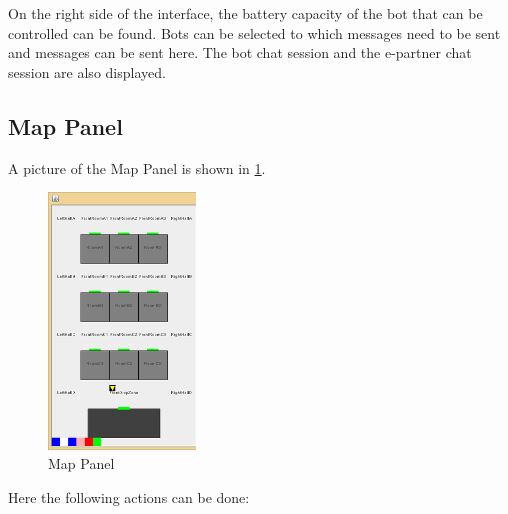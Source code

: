 On the right side of the interface, the battery capacity of the bot that can be controlled can be found. Bots can be selected to which messages need to be sent and messages can be sent here. The bot chat session and the e-partner chat session are also displayed.


\subsection{Map Panel}
A picture of the Map Panel is shown in \ref{fig:mapPanel}.

\begin{figure}[h]
\begin{center}
\includegraphics[width= 0.35\textwidth]{HumanPlayerGUI/hpg-left.png}
\end{center}
\caption{Map Panel}
\label{fig:mapPanel}
\end{figure}

Here the following actions can be done:

